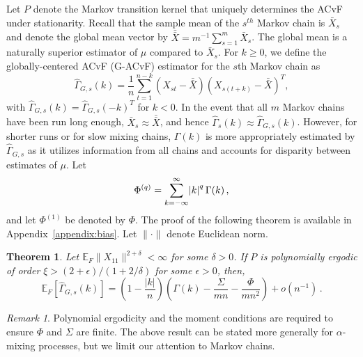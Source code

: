 \documentclass[11pt]{article}
\newcommand{\E}{\mathbb{E}}
\newtheorem{theorem}{Theorem}
\theoremstyle{remark}
\newtheorem{remark}{Remark}
\begin{document}
Let $P$ denote the Markov transition kernel that uniquely determines the ACvF under stationarity. Recall that the sample mean of the $s^{th}$ Markov chain is $\bar{X}_s$ and denote the global mean vector by $\bar{\bar{X}} = m^{-1}\sum_{s = 1}^{m}\bar{X}_s$. The global mean is a naturally superior estimator of $\mu$ compared to $\bar{X}_s$. For $k \geq 0$, we define the globally-centered ACvF (G-ACvF) estimator for the $s${th} Markov chain as
%
\begin{equation} \label{eq:G-ACvF}
    \hat{\Gamma}_{G,s}(k) = \dfrac{1}{n} \sum_{t=1}^{n-k}(X_{st}-\bar{\bar{X}})(X_{s(t+k)}-\bar{\bar{X}})^T,
\end{equation}
with $\hat{\Gamma}_{G,s}(k) = \hat{\Gamma}_{G,s}(-k)^T$ for $k < 0$. In the event that all $m$ Markov chains have been run long enough, $\bar{X}_s \approx \bar{\bar{X}}$, and hence  $\hat{\Gamma}_{s} (k) \approx \hat{\Gamma}_{G,s}(k)$. However, for shorter runs or for slow mixing chains, $\Gamma(k)$ is more appropriately estimated by $\hat{\Gamma}_{G,s}$ as it utilizes information from all chains and accounts for disparity between estimates of $\mu$. 
Let 
\begin{equation*}
\Phi^{(q)} = \sum_{ k= -\infty}^{\infty}\abs{k}^q \Gamma(k)\,,  
\end{equation*}
%
and let $\Phi^{(1)}$ be denoted by $\Phi$.  The proof of the following theorem is available in Appendix~\ref{appendix:bias}. Let $\|\cdot\|$ denote Euclidean norm. 


\begin{theorem} \label{th:G-ACF_bias} Let $\E_F \|X_{11}\|^{2 + \delta} < \infty$ for some $\delta > 0$. If $P$ is polynomially ergodic of order $\xi > (2 + \epsilon)/(1 + 2/\delta)$ for some $\epsilon > 0$,  then,
\[
   \mathbb{E}_F\left[\hat{\Gamma}_{G,s}(k) \right] = \left(1- \dfrac{|k|}{n}\right) \left(\Gamma(k) - \dfrac{\Sigma}{mn} - \dfrac{\Phi}{mn^2}\right)  + o \left(n^{-1} \right)\,.
\]
\end{theorem}

\begin{remark}
Polynomial ergodicity and the moment conditions are required to ensure $\Phi$ and $\Sigma$ are finite. The above result can be stated more generally for $\alpha$-mixing processes, but we limit our attention to Markov chains. 
\end{remark}
\end{document}
